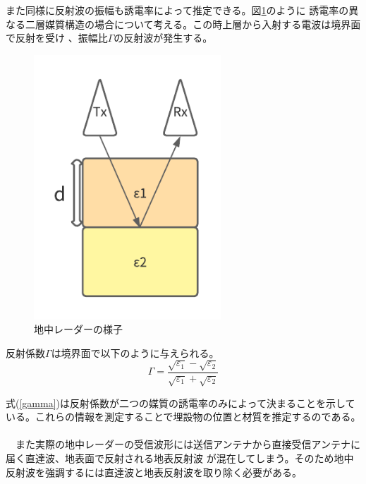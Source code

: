 \documentclass[a4paper,12pt]{jsreport}
\begin{document}
また同様に反射波の振幅も誘電率によって推定できる。図\ref{地中レーダーの様子}のように
誘電率の異なる二層媒質構造の場合について考える。この時上層から入射する電波は境界面で反射を受け
、振幅比$\Gamma$の反射波が発生する。

\begin{figure}[h]
  \begin{center}
   \includegraphics[width=7cm]{./image/radar.pdf}
   
  \caption{地中レーダーの様子}\label{地中レーダーの様子}
  \end{center}
  \end{figure}

反射係数$\Gamma$は境界面で以下のように与えられる。
\begin{equation}
  \Gamma=
  \frac{\sqrt{\varepsilon_{1}}-\sqrt{\varepsilon_{2}}}{\sqrt{\varepsilon_{1}}+\sqrt{\varepsilon_{2}}} 
\label{gamma}  
\end{equation}


式(\ref{gamma})は反射係数が二つの媒質の誘電率のみによって決まることを示している。これらの情報を測定することで埋設物の位置と材質を推定するのである。
\\
\\　また実際の地中レーダーの受信波形には送信アンテナから直接受信アンテナに届く直達波、地表面で反射される地表反射波
が混在してしまう。そのため地中反射波を強調するには直達波と地表反射波を取り除く必要がある。
\end{document}
